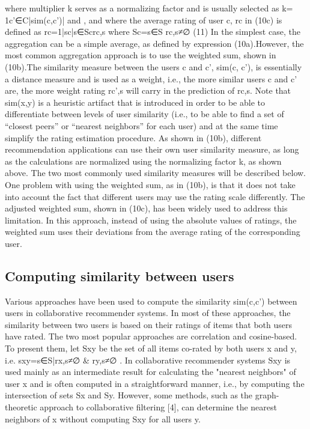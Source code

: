 where multiplier k serves as a normalizing factor and is usually selected as k= 1c'∈C|sim(c,c')| and , and where the average rating of user c, rc in (10c) is defined as
rc=1|sc|s∈Scrc,s where Sc=s∈S rc,s≠∅   (11) 
In the simplest case, the aggregation can be a simple average, as defined by expression (10a).However, the most common aggregation approach is to use the weighted sum, shown in (10b).The similarity measure between the users c and c’, sim(c, c’), is essentially a distance measure and is used as a weight, i.e., the more similar users c and c’ are, the more weight rating rc’,s will carry in the prediction of rc,s. Note that sim(x,y) is a heuristic artifact that is introduced in order to be able to differentiate between levels of user similarity (i.e., to be able to find a set of “closest peers” or “nearest neighbors” for each user) and at the same time simplify the rating estimation procedure. As shown in (10b), different recommendation applications can use their own user similarity measure, as long as the calculations are normalized using the normalizing factor k, as shown above. The two most commonly used similarity measures will be described below. One problem with using the weighted sum, as in (10b), is that it does not take into account the fact that different users may use the rating scale differently. The adjusted weighted sum, shown in (10c), has been widely used to address this limitation. In this approach, instead of using the absolute values of ratings, the weighted sum uses their deviations from the average rating of the corresponding user.


\subsection{Computing similarity between users}
Various approaches have been used to compute the similarity sim(c,c') between users in collaborative recommender systems. In most of these approaches, the similarity between two users is based on their ratings of items that both users have rated. The two most popular approaches are correlation and cosine-based. To present them, let Sxy be the set of all items co-rated by both users x and y, i.e. sxy={s∈S|rx,s≠∅ & ry,s≠∅ }. In collaborative recommender systems Sxy is used mainly as an intermediate result for calculating the "nearest neighbors" of user x and is often computed in a straightforward manner, i.e., by computing the intersection of sets Sx and Sy. However, some methods, such as the graph-theoretic approach to collaborative filtering [4], can determine the nearest neighbors of x without computing Sxy for all users y.


